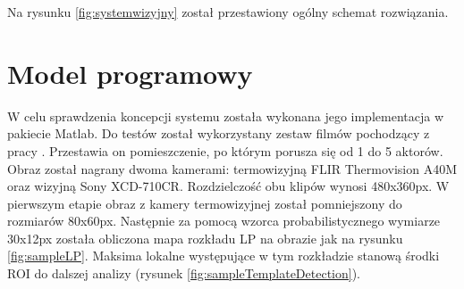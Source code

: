Na rysunku \ref{fig:systemwizyjny} został przestawiony ogólny schemat rozwiązania.

\section{Model programowy}
W celu sprawdzenia koncepcji systemu została wykonana jego implementacja w pakiecie Matlab. Do testów został wykorzystany zestaw filmów pochodzący z pracy \cite{bilodeau2014thermal}. Przestawia on pomieszczenie, po którym porusza się od 1 do 5 aktorów. Obraz został nagrany dwoma kamerami: termowizyjną FLIR Thermovision A40M oraz wizyjną Sony XCD-710CR. Rozdzielczość obu klipów wynosi 480x360px. W pierwszym etapie obraz z kamery termowizyjnej został pomniejszony do rozmiarów 80x60px. Następnie za pomocą wzorca probabilistycznego wymiarze 30x12px została obliczona mapa rozkładu LP na obrazie jak na rysunku \ref{fig:sampleLP}. Maksima lokalne występujące w tym rozkładzie stanową środki ROI do dalszej analizy (rysunek \ref{fig:sampleTemplateDetection}).
